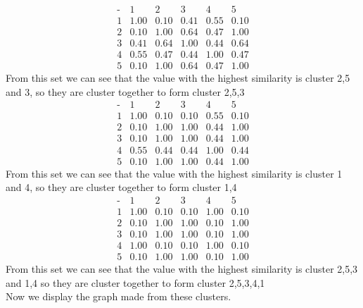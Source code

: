 \documentclass[12pt,english]{article}
\begin{document}
\begin{equation*}
\begin{array}{c|ccccc}
\mbox{-}& 1 & 2 & 3 & 4 & 5\\
\hline
1 & 1.00 & 0.10 & 0.41 & 0.55 & 0.10 \\
2 & 0.10 & 1.00 & 0.64 & 0.47 & 1.00 \\
3 & 0.41 & 0.64 & 1.00 & 0.44 & 0.64 \\
4 & 0.55 & 0.47 & 0.44 & 1.00 & 0.47 \\
5 & 0.10 & 1.00 & 0.64 & 0.47 & 1.00 
\end{array}
\end{equation*}
From this set we can see that the value with the highest similarity is cluster 2,5 and 3, so they are cluster together to form cluster 2,5,3\\
\begin{equation*}
\begin{array}{c|ccccc}
\mbox{-}& 1 & 2 & 3 & 4 & 5\\
\hline
1 & 1.00 & 0.10 & 0.10 & 0.55 & 0.10 \\
2 & 0.10 & 1.00 & 1.00 & 0.44 & 1.00 \\
3 & 0.10 & 1.00 & 1.00 & 0.44 & 1.00 \\
4 & 0.55 & 0.44 & 0.44 & 1.00 & 0.44 \\
5 & 0.10 & 1.00 & 1.00 & 0.44 & 1.00 
\end{array}
\end{equation*}
From this set we can see that the value with the highest similarity is cluster 1 and 4, so they are cluster together to form cluster 1,4\\
\begin{equation*}
\begin{array}{c|ccccc}
\mbox{-}& 1 & 2 & 3 & 4 & 5\\
\hline
1 & 1.00 & 0.10 & 0.10 & 1.00 & 0.10 \\
2 & 0.10 & 1.00 & 1.00 & 0.10 & 1.00 \\
3 & 0.10 & 1.00 & 1.00 & 0.10 & 1.00 \\
4 & 1.00 & 0.10 & 0.10 & 1.00 & 0.10 \\
5 & 0.10 & 1.00 & 1.00 & 0.10 & 1.00 
\end{array}
\end{equation*}
From this set we can see that the value with the highest similarity is cluster 2,5,3 and 1,4 so they are cluster together to form cluster 2,5,3,4,1\\
Now we display the graph made from these clusters.\\
\end{document}
